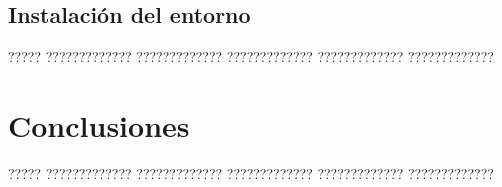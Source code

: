 \documentclass[11pt,spanish,listoffigures,listoftables]{tfgetsinf}
\begin{document}
\section{Instalación del entorno}






????? ????????????? ????????????? ????????????? ????????????? ?????????????



\chapter{Conclusiones}

????? ????????????? ????????????? ????????????? ????????????? ????????????? 


\printglossaries






\end{document}
